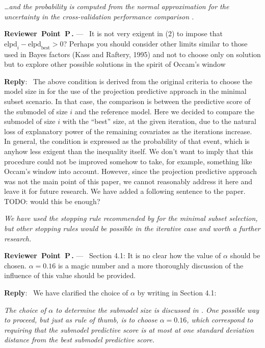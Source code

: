 \documentclass[11pt]{article}
\newcounter{reviewer}
\newcounter{point}[reviewer]
\renewcommand{\thepoint}{P\,\thereviewer.\arabic{point}}
\newenvironment{point}
   {\refstepcounter{point} \bigskip \noindent \begin{sf}{\textbf{Reviewer~Point~\thepoint} } ---\ }
   {\par \end{sf}}
\newenvironment{reply}
   {\medskip \noindent \textbf{Reply}:\  }
   {\medskip}
\begin{document}
\textit{
\ldots and the probability is computed from the normal approximation for the uncertainty in the cross-validation performance comparison \citep{Vehtari+etal:2017:practical,paper:projpred,Sivula+etal:2020:loo_uncertainty}.
}

\begin{point}
It is not very exigent in (2) to impose that $\text{elpd}_i-\text{elpd}_\text{best}>0$? Perhaps you should consider other limits similar to those used in Bayes factors (Kass and Raftery, 1995) and not to choose only on solution but to explore other possible solutions in the spirit of Occam’s window
\end{point}

\begin{reply}
The above condition is derived from the original criteria to choose the model size in \citet{paper:projpred} for the use of the projection predictive approach in the minimal subset scenario. In that case, the comparison is between the predictive score of the submodel of size $i$ and the reference model. Here we decided to compare the submodel of size $i$ with the ``best'' size, at the given iteration, due to the natural loss of explanatory power of the remaining covariates as the iterations increase. \\
In general, the condition is expressed as the probability of that event, which is anyhow less exigent than the inequality itself. We don't want to imply that this procedure could not be improved somehow to take, for example, something like Occam's window into account. However, since the projection predictive approach was not the main point of this paper, we cannot reasonably address it here and leave it for future research. We have added a following sentence to the paper.
TODO: would this be enough?
\end{reply}

\vspace{0.5\baselineskip}
\textit{
We have used the stopping rule recommended by \citet{paper:projpred} for the minimal subset selection, but other stopping rules would be possible in the iterative case and worth a further research.
}

\begin{point}
Section 4.1: It is no clear how the value of $\alpha$ should be chosen. $\alpha= 0.16$ is a magic number and a more thoroughly discussion of the influence of this value should be provided.
\end{point}

\begin{reply}
We have clarified the choice of $\alpha$ by writing in Section 4.1:

\vspace{0.5\baselineskip}

\textit{The choice of $\alpha$ to determine the submodel size is discussed in \citet{paper:projpred}. One possible way to proceed, but just as rule of thumb, is to choose $\alpha=0.16$, which correspond to requiring that the submodel predictive score is at most at one standard deviation distance from the best submodel predictive score.}

\end{reply}
\end{document}
